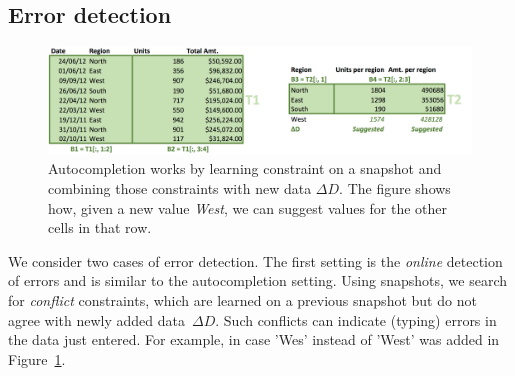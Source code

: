 \subsection{Error detection}
\begin{figure}[t]
\begin{center}
    \includegraphics[width=1.0\linewidth]{figures/Learning.png}
  \end{center}
  \caption{Autocompletion works by learning constraint on a snapshot and combining those constraints with new data $\Delta D$.
  The figure shows how, given a new value \textit{West}, we can suggest values for the other cells in that row.}
  \label{fig:autocompletion_example}
\end{figure}

We consider two cases of error detection.
The first setting is the \textit{online} detection of errors and is similar to the autocompletion setting.
Using snapshots, we search for \textit{conflict} constraints, which are learned on a previous snapshot but do not agree with newly added data~$\Delta D$.
Such conflicts can indicate (typing) errors in the data just entered. For example, in case 'Wes' instead of 'West' was added in Figure~\ref{fig:autocompletion_example}.

